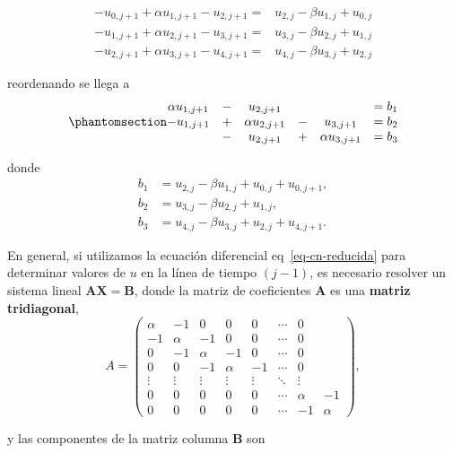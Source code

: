 \documentclass[
  spanish,
  us-letterpaper,
  DIV=11,
  numbers=noendperiod]{scrreprt}
\theoremstyle{plain}
\theoremstyle{definition}
\theoremstyle{remark}
\begin{document}
\[
\begin{split}
-u_{0,j+1} + \alpha u_{1,j+1} - u_{2,j+1} =& u_{2,j} - \beta u_{1,j} + u_{0,j} \\
-u_{1,j+1} + \alpha u_{2,j+1} - u_{3,j+1} =& u_{3,j} - \beta u_{2,j} + u_{1,j} \\
-u_{2,j+1} + \alpha u_{3,j+1} - u_{4,j+1} =& u_{4,j} - \beta u_{3,j} + u_{2,j}
\end{split}
\]

reordenando se llega a
\begin{equation}\phantomsection\label{eq-cn-matrix}{
\begin{matrix}
\alpha u_{1,j+1} &-& u_{2,j+1}&& &= b_1 \\
-u_{1,j+1} &+& \alpha u_{2,j+1} &-& u_{3,j+1} &= b_2 \\
&-&u_{2,j+1} &+& \alpha u_{3,j+1} &= b_3
\end{matrix}
}\end{equation}

donde \begin{align*}
b_1 &= u_{2,j} - \beta u_{1,j} + u_{0,j} + u_{0,j+1}, \\
b_2 &= u_{3,j} - \beta u_{2,j} + u_{1,j}, \\
b_3 &= u_{4,j} - \beta u_{3,j} + u_{2,j} + u_{4,j+1}.
\end{align*}

En general, si utilizamos la ecuación diferencial
eq~\ref{eq-cn-reducida} para determinar valores de \(u\) en la línea de
tiempo \((j -1)\), es necesario resolver un sistema lineal
\(\mathbf{AX=B}\), donde la matriz de coeficientes \(\mathbf{A}\) es una
\textbf{matriz tridiagonal}, \[
A = 
\begin{pmatrix}
\alpha & -1    & 0      & 0      & 0      & \cdots & 0      \\
-1     & \alpha & -1     & 0      & 0      & \cdots & 0      \\
0      & -1     & \alpha & -1     & 0      & \cdots & 0      \\
0      & 0      & -1     & \alpha & -1     & \cdots & 0      \\
\vdots & \vdots & \vdots & \vdots & \vdots & \ddots & \vdots \\
0      & 0      & 0      & 0      & 0      & \cdots & \alpha & -1 \\
0      & 0      & 0      & 0      & 0      & \cdots & -1     & \alpha
\end{pmatrix},
\]

y las componentes de la matriz columna \(\mathbf{B}\) son
\end{document}
